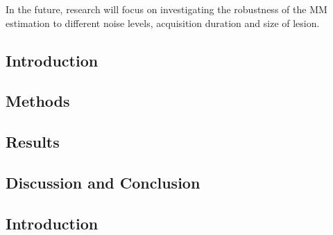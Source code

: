             In the future, research will focus on investigating the robustness of the \gls{MM} estimation to different noise levels, acquisition duration and size of lesion.
    
        \blindtext
        
        \subsection{Introduction} \label{impact_of_tof_on_respiratory_motion_modelling_using_nac_pet_an_extension_to_inter_and_intra_respiratory_cycle_variation_introduction}
        
        \subsection{Methods} \label{impact_of_tof_on_respiratory_motion_modelling_using_nac_pet_an_extension_to_inter_and_intra_respiratory_cycle_variation_methods}
            \blindtext
            
        \subsection{Results} \label{impact_of_tof_on_respiratory_motion_modelling_using_nac_pet_an_extension_to_inter_and_intra_respiratory_cycle_variation_results}
            \blindtext
            
        \subsection{Discussion and Conclusion} \label{impact_of_tof_on_respiratory_motion_modelling_using_nac_pet_an_extension_to_inter_and_intra_respiratory_cycle_variation_discussion_and_conclusion}
            \blindtext
    
        \blindtext
        
        \subsection{Introduction} \label{extension_of_static_pca_based_data_driven_surrogate_signal_extraction_to_dynamic_pet_introduction}
        
